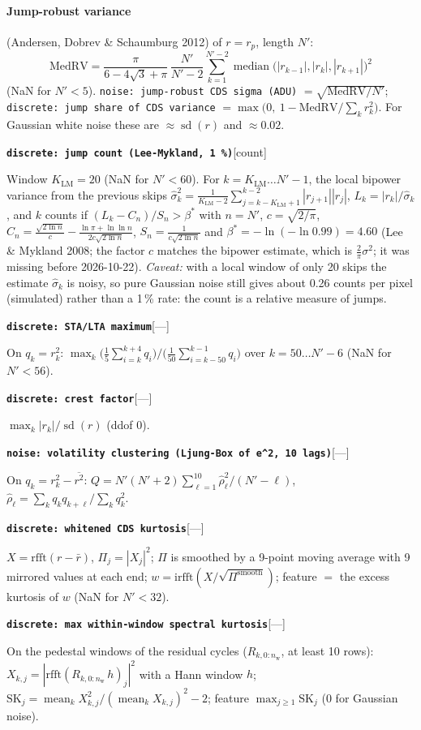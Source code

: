 \documentclass[10pt]{article}
\newcommand{\code}[1]{\texttt{#1}}
\newcommand{\feat}[2]{\par\medskip\noindent\textbf{\texttt{#1}}\hfill{\small [#2]}\par\nopagebreak\smallskip}
\newcommand{\med}{\operatorname*{median}}
\newcommand{\mean}{\operatorname*{mean}}
\newcommand{\std}{\operatorname{sd}}
\newcommand{\nw}{n_\text{w}}
\begin{document}
\paragraph{Jump-robust variance} (Andersen, Dobrev \& Schaumburg 2012) of $r = r_p$, length $N'$:
\begin{equation}
\text{MedRV} = \frac{\pi}{6 - 4\sqrt3 + \pi}\,\frac{N'}{N'-2}\sum_{k=1}^{N'-2}\med\bigl(|r_{k-1}|, |r_k|, |r_{k+1}|\bigr)^2
\end{equation}
(NaN for $N' < 5$). \code{noise: jump-robust CDS sigma (ADU)} $= \sqrt{\text{MedRV}/N'}$; \code{discrete: jump share of CDS variance}
$= \max\bigl(0,\ 1 - \text{MedRV}/\sum_k r_k^2\bigr)$. For Gaussian white noise these are $\approx \std(r)$ and $\approx 0.02$.
\feat{discrete: jump count (Lee-Mykland, 1 \%)}{count}
Window $K_\text{LM} = 20$ (NaN for $N' < 60$). For $k = K_\text{LM} \dots N'-1$, the local bipower variance from the previous skips
$\hat\sigma_k^2 = \frac{1}{K_\text{LM}-2}\sum_{j=k-K_\text{LM}+1}^{k-2}|r_{j+1}||r_j|$, $L_k = |r_k|/\hat\sigma_k$, and $k$ counts if
$(L_k - C_n)/S_n > \beta^\ast$ with $n = N'$, $c = \sqrt{2/\pi}$,
$C_n = \frac{\sqrt{2\ln n}}{c} - \frac{\ln\pi + \ln\ln n}{2c\sqrt{2\ln n}}$, $S_n = \frac{1}{c\sqrt{2\ln n}}$ and
$\beta^\ast = -\ln(-\ln 0.99) = 4.60$ (Lee \& Mykland 2008; the factor $c$ matches the bipower estimate, which is
$\tfrac2\pi\sigma^2$; it was missing before 2026-10-22). \emph{Caveat:} with a local window of only 20 skips the estimate
$\hat\sigma_k$ is noisy, so pure Gaussian noise still gives about 0.26 counts per pixel (simulated) rather than a 1\,\% rate:
the count is a relative measure of jumps.
\feat{discrete: STA/LTA maximum}{---}
On $q_k = r_k^2$: $\max_k \bigl(\tfrac15\sum_{i=k}^{k+4} q_i\bigr)\big/\bigl(\tfrac1{50}\sum_{i=k-50}^{k-1}q_i\bigr)$ over
$k = 50 \dots N'-6$ (NaN for $N' < 56$).
\feat{discrete: crest factor}{---}
$\max_k|r_k|/\std(r)$ (ddof 0).
\feat{noise: volatility clustering (Ljung-Box of e\^{}2, 10 lags)}{---}
On $q_k = r_k^2 - \overline{r^2}$: $Q = N'(N'+2)\sum_{\ell=1}^{10}\hat\rho_\ell^2/(N' - \ell)$, $\hat\rho_\ell = \sum_k q_kq_{k+\ell}/\sum_k q_k^2$.
\feat{discrete: whitened CDS kurtosis}{---}
$X = \mathrm{rfft}(r - \bar r)$, $\Pi_j = |X_j|^2$; $\Pi$ is smoothed by a 9-point moving average with 9 mirrored values at each end;
$w = \mathrm{irfft}(X/\sqrt{\Pi^\text{smooth}})$; feature $=$ the excess kurtosis of $w$ (NaN for $N' < 32$).
\feat{discrete: max within-window spectral kurtosis}{---}
On the pedestal windows of the residual cycles ($R_{k,0:\nw}$, at least 10 rows): $X_{k,j} = |\mathrm{rfft}(R_{k,0:\nw}\,h)_j|^2$ with a
Hann window $h$; $\mathrm{SK}_j = \mean_k X_{k,j}^2/(\mean_k X_{k,j})^2 - 2$; feature $\max_{j\ge1}\mathrm{SK}_j$ (0 for Gaussian noise).
\end{document}
